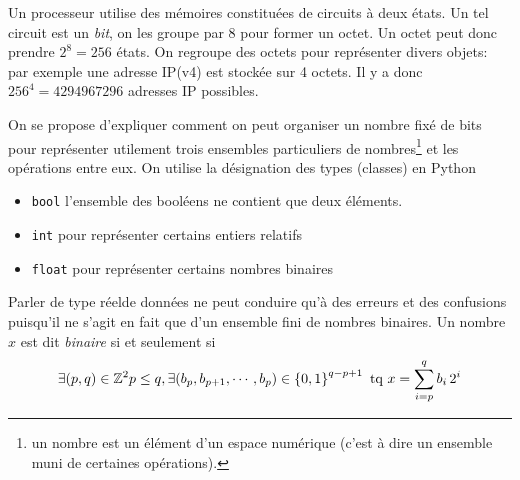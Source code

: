 


Un processeur utilise des mémoires constituées de circuits à deux états. Un tel circuit est un \emph{bit}, on les groupe par 8 pour former un octet. Un octet peut donc prendre $2^8=256$ états.\newline
On regroupe des octets pour représenter divers objets: par exemple une adresse IP(v4) est stockée sur 4 octets. Il y a donc $256^4 = 4294967296$ adresses IP possibles.

On se propose d'expliquer comment on peut organiser un nombre fixé de bits pour représenter utilement trois ensembles particuliers de nombres\footnote{un nombre est un élément d'un espace numérique (c'est à dire un ensemble muni de certaines opérations).} et les opérations entre eux. On utilise la désignation des types (classes) en Python
\begin{itemize}
  \item \texttt{bool} l'ensemble des booléens ne contient que deux éléments.
  \item \texttt{int} pour représenter certains entiers relatifs
  \item \texttt{float} pour représenter certains nombres binaires
\end{itemize}
Parler de type \og réel\fg de données ne peut conduire qu'à des erreurs et des confusions puisqu'il ne s'agit en fait que d'un ensemble fini de nombres binaires.\newline
Un nombre $x$ est dit \emph{binaire} si et seulement si 
\begin{displaymath}
\exists (p,q)\in \mathbb{Z}^2 p\leq q, \exists (b_p,b_{p+1}, \cdots , b_p)\in \left\lbrace 0,1\right\rbrace^{q-p+1} \text{ tq }
x = \sum_{i = p}^q b_i\,2^{i}
\end{displaymath}

 
